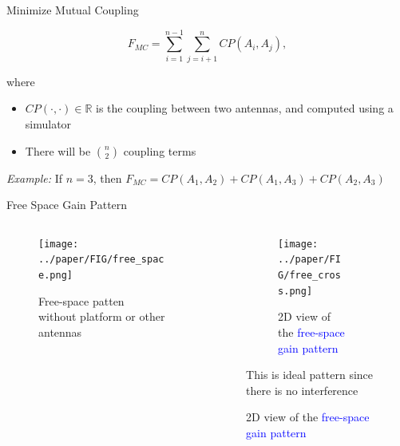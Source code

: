 \documentclass{beamer}
\begin{document}
\begin{frame}{Minimize Mutual Coupling}
    \begin{tcolorbox}[colback=green!5]
        \begin{equation}
            F_{MC} = \sum_{i=1}^{n-1}\sum_{j=i+1}^{n} CP(A_i, A_j),
        \end{equation}
    \end{tcolorbox}
    where
    \begin{itemize}
        \item $CP(\cdot, \cdot) \in \mathbb R$ is the coupling between two antennas, and computed using a simulator
        \item There will be $n \choose 2$ coupling terms 
    \end{itemize}
    \vspace{2mm}
    \small\textit{Example:} If $n=3$, then $F_{MC} = CP(A_1, A_2) + CP(A_1, A_3) + CP(A_2, A_3)$
\end{frame}

\begin{frame}{Free Space Gain Pattern}
    \begin{columns}
        \begin{column}{0.5\linewidth}
            \begin{figure}
                \vspace{-2.5cm}
                \centering
                \texttt{[image: ../paper/FIG/free\_space.png]}
                \caption*{\tiny Free-space patten without platform or other antennas}
            \end{figure}
        \end{column}
        \begin{column}{0.5\linewidth}
            \begin{overlayarea}{\textwidth}{\textheight}
                \begin{figure}
                    \begin{subfigure}{\columnwidth}
                        \centering
                        \texttt{[image: ../paper/FIG/free\_cross.png]}
                        \caption*{\tiny 2D view of the \textcolor{blue}{free-space gain pattern}}%
                    \end{subfigure}\vspace*{2mm}
                    \begin{tcolorbox}[colback=green!5]
                        \centering
                        This is ideal pattern since there is no interference
                    \end{tcolorbox}
                \end{figure}
            \end{overlayarea}
        \end{column}
    \end{columns}
\end{frame}
\end{document}
